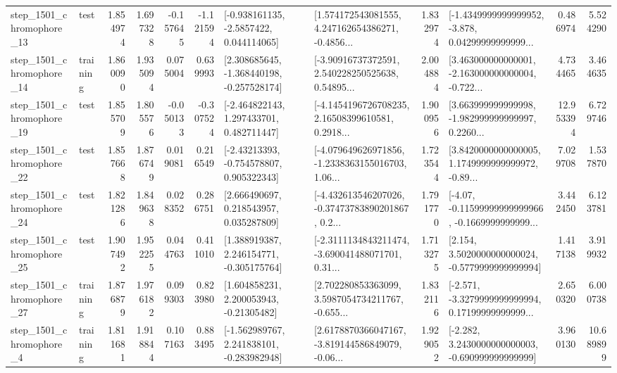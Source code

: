 \begin{tabular}{llrrrrllrlrr}
 step\_1501\_chromophore\_13 &      test &      1.854974 &    1.697328 &     -0.157645 & -1.121594 &     [-0.938161135, -2.5857422, 0.044114065] &  [1.574172543081555, 4.247162654386271, -0.4856... &       1.832974 &  [-1.4349999999999952, -3.878, 0.04299999999999... &            0.486974 &          5.524290 \\
 step\_1501\_chromophore\_14 &  training &      1.860090 &    1.935094 &      0.075004 &  0.639993 &   [2.308685645, -1.368440198, -0.257528174] &  [-3.90916737372591, 2.540228250525638, 0.54895... &       2.004884 &  [3.463000000000001, -2.163000000000004, -0.722... &            4.734465 &          3.464635 \\
 step\_1501\_chromophore\_19 &      test &      1.855709 &    1.805576 &     -0.050133 & -0.307524 &    [-2.464822143, 1.297433701, 0.482711447] &  [-4.1454196726708235, 2.16508399610581, 0.2918... &       1.900956 &  [3.663999999999998, -1.982999999999997, 0.2260... &           12.953394 &          6.729746 \\
 step\_1501\_chromophore\_22 &      test &      1.857668 &    1.876749 &      0.019081 &  0.216549 &    [-2.43213393, -0.754578807, 0.905322343] &  [-4.079649626971856, -1.2338363155016703, 1.06... &       1.723544 &  [3.8420000000000005, 1.1749999999999972, -0.89... &            7.029708 &          1.537870 \\
 step\_1501\_chromophore\_24 &      test &      1.821286 &    1.849638 &      0.028352 &  0.286751 &     [2.666490697, 0.218543957, 0.035287809] &  [-4.432613546207026, -0.37473783890201867, 0.2... &       1.791770 &  [-4.07, -0.11599999999999966, -0.1669999999999... &            3.442450 &          6.123781 \\
 step\_1501\_chromophore\_25 &      test &      1.907492 &    1.952255 &      0.044763 &  0.411010 &    [1.388919387, 2.246154771, -0.305175764] &  [-2.3111134843211474, -3.690041488071701, 0.31... &       1.713275 &   [2.154, 3.5020000000000024, -0.5779999999999994] &            1.417138 &          3.919932 \\
 step\_1501\_chromophore\_27 &  training &      1.876879 &    1.976182 &      0.099303 &  0.823980 &     [1.604858231, 2.200053943, -0.21305482] &  [2.702280853363099, 3.5987054734211767, -0.655... &       1.832116 &  [-2.571, -3.3279999999999994, 0.17199999999999... &            2.650320 &          6.000738 \\
  step\_1501\_chromophore\_4 &  training &      1.811681 &    1.918844 &      0.107163 &  0.883495 &   [-1.562989767, 2.241838101, -0.283982948] &  [2.6178870366047167, -3.819144586849079, -0.06... &       1.929052 &   [-2.282, 3.2430000000000003, -0.690999999999999] &            3.960130 &         10.689899 \\

\end{tabular}

